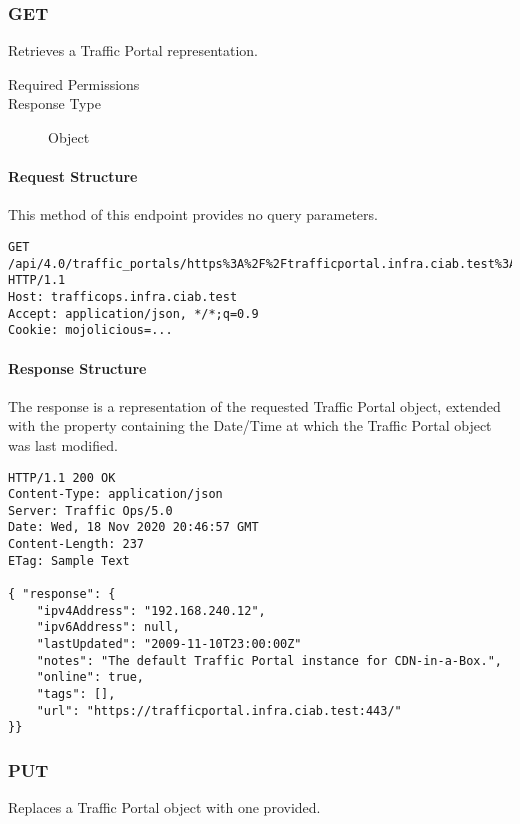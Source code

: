 \subsubsection{GET}
Retrieves a Traffic Portal representation.
\begin{description}
	\item[Required Permissions] 
	\item[Response Type] Object
\end{description}

\paragraph{Request Structure}
This method of this endpoint provides no query parameters.

\begin{codelisting}
\begin{verbatim}
GET /api/4.0/traffic_portals/https%3A%2F%2Ftrafficportal.infra.ciab.test%3A443 HTTP/1.1
Host: trafficops.infra.ciab.test
Accept: application/json, */*;q=0.9
Cookie: mojolicious=...

\end{verbatim}
\end{codelisting}

\paragraph{Response Structure}
The response is a representation of the requested Traffic Portal object,
extended with the  property containing the Date/Time at which
the Traffic Portal object was last modified.

\begin{codelisting}
\begin{verbatim}
HTTP/1.1 200 OK
Content-Type: application/json
Server: Traffic Ops/5.0
Date: Wed, 18 Nov 2020 20:46:57 GMT
Content-Length: 237
ETag: Sample Text

{ "response": {
	"ipv4Address": "192.168.240.12",
	"ipv6Address": null,
	"lastUpdated": "2009-11-10T23:00:00Z"
	"notes": "The default Traffic Portal instance for CDN-in-a-Box.",
	"online": true,
	"tags": [],
	"url": "https://trafficportal.infra.ciab.test:443/"
}}
\end{verbatim}
\end{codelisting}

\subsubsection{PUT}
Replaces a Traffic Portal object with one provided.

